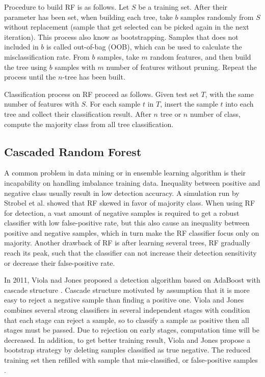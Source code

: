 \documentclass[conference,compsoc,a4paper,twocolumn,final]{IEEEtran}
\begin{document}
Procedure to build RF is as follows.
Let $S$ be a training set.
After their parameter has been set, when building each tree, take $b$ samples
randomly from $S$ without replacement (sample that get selected can be picked
again in the next iteration).
This process also know as bootstrapping.
Samples that does not included in $b$ is called out-of-bag (OOB), which can be
used to calculate the misclassification rate.
From $b$ samples, take $m$ random features, and then build the tree using $b$
samples with $m$ number of features without pruning.
Repeat the process until the $n$-tree has been built.

Classification process on RF proceed as follows.
Given test set $T$, with the same number of features with $S$.
For each sample $t$ in $T$, insert the sample $t$ into each tree and collect
their classification result.
After $n$ tree or $n$ number of class, compute the majority class from all
tree classification.

\subsection{Cascaded Random Forest}
\label{subsection:crf}

A common problem in data mining or in ensemble learning algorithm is their
incapability on handling imbalance training data.
Inequality between positive and negative class usually result in low
detection accuracy.
A simulation run by Strobel et al. \cite{strobl2007bias} showed that RF skewed
in favor of majority class.
When using RF for detection, a vast amount of negative samples is required to
get a robust classifier with low false-positive rate, but this also cause an
inequality between positive and negative samples, which in turn make the RF
classifier focus only on majority.
Another drawback of RF is after learning several trees, RF gradually reach its
peak, such that the classifier can not increase their detection sensitivity or
decrease their false-positive rate.

In 2011, Viola nad Jones proposed a detection algorithm based on AdaBoost with
cascade structure \cite{viola2004robust}.
Cascade structure motivated by assumption that it is more easy to reject a
negative sample than finding a positive one.
Viola and Jones combines several strong classifiers in several independent
stages with condition that each stage can reject a sample, so to classify a
sample as positive then all stages must be passed.
Due to rejection on early stages, computation time will be decreased.
In addition, to get better training result, Viola and Jones propose a bootstrap
strategy by deleting samples classified as true negative.
The reduced training set then refilled with sample that mis-classified, or
false-positive samples
\cite{viola2004robust}.
\end{document}
